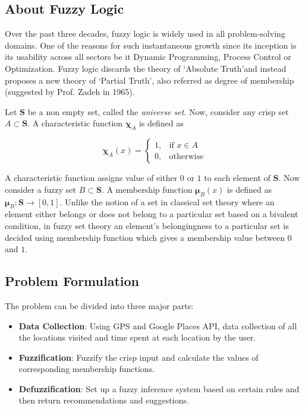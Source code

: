 \documentclass[conference]{IEEEtran}
\begin{document}
\subsection{About Fuzzy Logic}

Over the past three decades, fuzzy logic is widely used in all problem-solving domains. One of the reasons for such instantaneous growth since its inception is its usability across all sectors be it Dynamic Programming, Process Control or Optimization. Fuzzy logic discards the theory of \lq Absolute Truth\rq and instead proposes a new theory of \lq Partial Truth\rq, also referred as degree of membership (suggested by Prof. Zadeh in 1965).

Let $\mathbf{S}$ be a non empty set, called the \textit{universe set}. Now, consider any crisp set $A \subset \mathbf{S}$. A characteristic function $\mathbold{\chi}_A$ is defined as

$$
\mathbold{\chi}_A(x) = 
\begin{cases}
    1, & \text{if } x\in A\\
    0, & \text{otherwise}
\end{cases}
$$

A characteristic function assigns value of either $0$ or $1$ to each element of $\mathbf{S}$. Now consider a fuzzy set $B \subset \mathbf{S}$. A membership function $\mathbold{\mu}_B(x)$ is defined as $\mathbold{\mu}_B:\mathbf{S}\rightarrow[0, 1]$. Unlike the notion of a set in classical set theory where an element either belongs or does not belong to a particular set based on a bivalent condition, in fuzzy set theory an element\rq s belongingness to a particular set is decided using membership function which gives a membership value between $0$ and $1$.

\subsection{Problem Formulation}

The problem can be divided into three major parts:

\begin{itemize}
\item \textbf{Data Collection}: Using GPS and Google Places API, data collection of all the locations visited and time spent at each location by the user.
\item \textbf{Fuzzification}: Fuzzify the crisp input and calculate the values of corresponding membership functions.
\item \textbf{Defuzzification}: Set up a fuzzy inference system based on certain rules and then return recommendations and suggestions.
\end{itemize}
\end{document}
